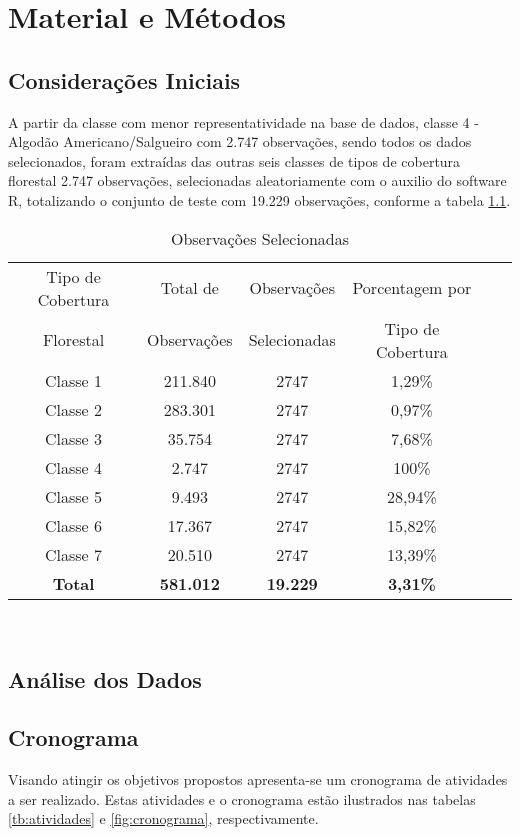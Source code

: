 \chapter{Material e Métodos}

\section{Considerações Iniciais}
A partir da classe com menor representatividade na base de dados, classe 4 - Algodão Americano/Salgueiro com 2.747 observações, sendo todos os dados selecionados, foram extraídas das outras seis classes de tipos de cobertura florestal 2.747 observações, selecionadas aleatoriamente com o auxilio do software R, totalizando o conjunto de teste com 19.229 observações, conforme a tabela \ref{tb:dados}.

\begin{table}[htbp]
\caption{Observações Selecionadas}
\label{tb:dados}
\centering
\setlength{\tabcolsep}{5pt}
\begin{tabular}{cccccc}
\hline
Tipo de Cobertura  &Total de  &Observações  &Porcentagem por \\
Florestal &Observações &Selecionadas &Tipo de Cobertura \\
\hline
Classe 1 &211.840 &2747 &1,29\% \\
Classe 2 &283.301 &2747 &0,97\% \\
Classe 3 &35.754  &2747 &7,68\% \\
Classe 4 &2.747   &2747 &100\% \\
Classe 5 &9.493   &2747 &28,94\% \\
Classe 6 &17.367  &2747 &15,82\% \\
Classe 7 &20.510  &2747 &13,39\% \\
\hline
\textbf{Total} &\textbf{581.012} &\textbf{19.229} &\textbf{3,31\%} \\
\hline
\end{tabular}
\\
\end{table}

\section{Análise dos Dados}


\section{Cronograma}
Visando atingir os objetivos propostos apresenta-se um cronograma
de atividades a ser realizado. Estas atividades e o cronograma
estão ilustrados nas tabelas \ref{tb:atividades} e
\ref{fig:cronograma}, respectivamente.


